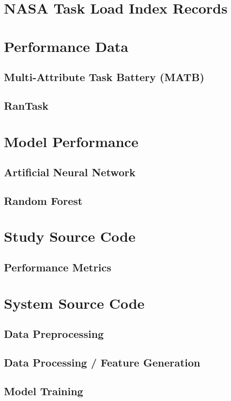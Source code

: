 \documentclass[11pt]{article}
\begin{document}
\pagebreak
\begin{appendices}
\appendixpage
\noappendicestocpagenum
\addappheadtotoc
\section{NASA Task Load Index Records}
\section{Performance Data}
	\subsection{Multi-Attribute Task Battery (MATB)}
	\subsection{RanTask}
\section{Model Performance}
	\subsection{Artificial Neural Network}
	\subsection{Random Forest}
\section{Study Source Code}
	\subsection{Performance Metrics}
\section{System Source Code}
	\subsection{Data Preprocessing}
	\subsection{Data Processing / Feature Generation}
	\subsection{Model Training}
\end{appendices}	
\end{document}
